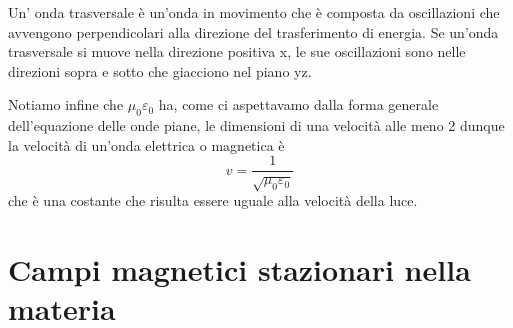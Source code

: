 \documentclass[
10pt, %
a4paper, %
oneside, %
headinclude,footinclude, %
BCOR5mm, %
]{scrartcl}
\begin{document}
\begin{definizione}
	Un' onda trasversale è un'onda in movimento che è composta da oscillazioni che avvengono perpendicolari alla direzione del trasferimento di energia. Se un'onda trasversale si muove nella direzione positiva x, le sue oscillazioni sono nelle direzioni sopra e sotto che giacciono nel piano yz.
\end{definizione}
Notiamo infine che $\mu_0\varepsilon_0$ ha, come ci aspettavamo dalla forma generale dell'equazione delle onde piane, le dimensioni di una velocità alle meno 2 dunque la velocità di un'onda elettrica o magnetica è 
\[v = \frac{1}{\sqrt{\mu_0\varepsilon_0}}\]
che è una costante che risulta essere uguale alla velocità della luce. 
\section{Campi magnetici stazionari nella materia}
\end{document}
